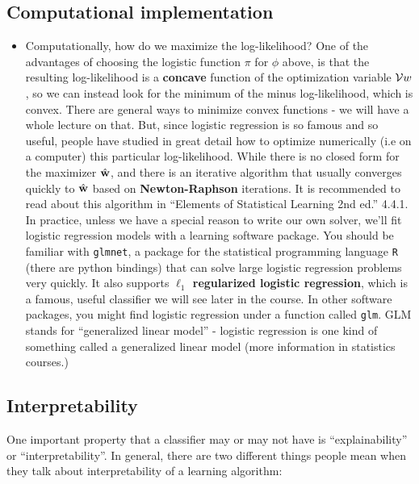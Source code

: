   \subsection{Computational implementation}
  \begin{itemize}
  \item
      Computationally, how do we maximize the log-likelihood? One of the
      advantages of choosing the logistic function $\pi$ for $\phi$ above, is
      that the resulting log-likelihood is a {\bf concave} function of the
      optimization variable $\mathcal{V}{w}$, so we can instead look for the minimum of
      the minus log-likelihood, which is convex. There are general ways to
      minimize convex functions - we will have a whole lecture on that. But,
      since logistic regression is so famous and so useful, people have studied
      in great detail how to optimize numerically (i.e on a computer) this
      particular log-likelihood. While there is no closed form for the maximizer
      $\hat{\mathbf{w}}$,  and there is an iterative algorithm that usually
      converges quickly to $\hat{\mathbf{w}}$ based on {\bf Newton-Raphson}
      iterations. It is recommended to read about this algorithm in ``Elements
      of Statistical Learning 2nd ed.'' 4.4.1. 
      In practice, unless we have a special reason to write our own solver,
      we'll fit logistic regression models with a learning software package. You should be
      familiar with {\tt glmnet}, a package for the statistical programming
      language {\tt R} (there are python bindings) that can solve large logistic
      regression problems very quickly. It also supports {\bf $\ell_1$ regularized
      logistic regression}, which is a famous, useful 
      classifier we will see later in the course. In other software packages,
      you might find logistic regression under a function called {\tt glm}. GLM
      stands for ``generalized linear model'' - logistic regression is one kind
      of something called a generalized linear model (more information in
      statistics courses.)

\end{itemize}

\subsection{Interpretability}

One important property that a classifier may or may not have is
``explainability'' or ``interpretability''. In general, there are two different things 
people mean when they talk about interpretability of a learning algorithm:
